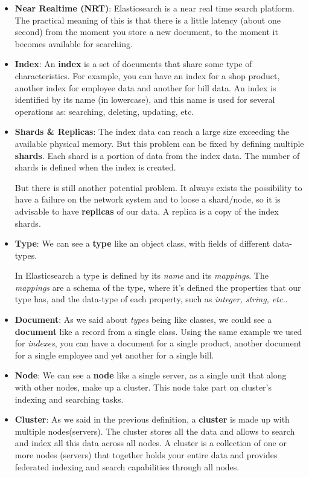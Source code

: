 \documentclass[a4paper, 12pt, english]{book}
\begin{document}
\begin{itemize}
    \item \textbf{Near Realtime (NRT)}:
        Elasticsearch is a near real time search platform.
        The practical meaning of this is that there is a little latency (about one second) from the moment you store a new document, to the moment it becomes available for searching.
    \item \textbf{Index}:
        An \textbf{index} is a set of documents that share some type of characteristics. For example, you can have an index for a shop product, another index for employee data and another for bill data. An index is identified by its name (in lowercase), and this name is used for several operations as: searching, deleting, updating, etc.
    \item \textbf{Shards \& Replicas}:
        The index data can reach a large size exceeding the available physical memory.
        But this problem can be fixed by defining multiple \textbf{shards}. Each shard is a portion of data from the index data. The number of shards is defined when the index is created.

        But there is still another potential problem. It always exists the possibility to have a failure on the network system and to loose a shard/node, so it is advisable to have \textbf{replicas} of our data. A replica is a copy of the index shards.
    \item \textbf{Type}:
        We can see a \textbf{type} like an object class, with fields of different data-types.

        In Elasticsearch a type is defined by its \textit{name} and its \textit{mappings}. The \textit{mappings} are a schema of the type, where it's defined the properties that our type has, and the data-type of each property, such as \textit{integer, string, etc.}.
    \item \textbf{Document}:
        As we said about \textit{types} being like classes, we could see a \textbf{document} like a record from a single class.
        Using the same example we used for \textit{indexes}, you can have a document for a single product, another document for a single employee and yet another for a single bill.
    \item \textbf{Node}:
        We can see a \textbf{node} like a single server, as a single unit that along with other nodes, make up a cluster. This node take part on cluster's indexing and searching tasks.
    \item \textbf{Cluster}:
        As we said in the previous definition, a \textbf{cluster} is made up with multiple nodes(servers). The cluster stores all the data and allows to search and index all this data across all nodes.
        A cluster is a collection of one or more nodes (servers) that together holds your entire data and provides federated indexing and search capabilities through all nodes.
\end{itemize}
\end{document}

